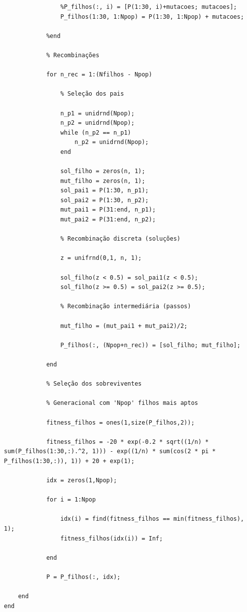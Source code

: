 \documentclass{report}
\begin{document}
\begin{lstlisting}
                %P_filhos(:, i) = [P(1:30, i)+mutacoes; mutacoes];
                P_filhos(1:30, 1:Npop) = P(1:30, 1:Npop) + mutacoes;

            %end

            % Recombinações

            for n_rec = 1:(Nfilhos - Npop)
                
                % Seleção dos pais                

                n_p1 = unidrnd(Npop);
                n_p2 = unidrnd(Npop);
                while (n_p2 == n_p1)
                    n_p2 = unidrnd(Npop);
                end
                        
                sol_filho = zeros(n, 1);
                mut_filho = zeros(n, 1);
                sol_pai1 = P(1:30, n_p1);
                sol_pai2 = P(1:30, n_p2);
                mut_pai1 = P(31:end, n_p1);
                mut_pai2 = P(31:end, n_p2);

                % Recombinação discreta (soluções)
                
                z = unifrnd(0,1, n, 1);

                sol_filho(z < 0.5) = sol_pai1(z < 0.5);
                sol_filho(z >= 0.5) = sol_pai2(z >= 0.5);

                % Recombinação intermediária (passos)

                mut_filho = (mut_pai1 + mut_pai2)/2;

                P_filhos(:, (Npop+n_rec)) = [sol_filho; mut_filho];
                    
            end

            % Seleção dos sobreviventes

            % Generacional com 'Npop' filhos mais aptos

            fitness_filhos = ones(1,size(P_filhos,2));
            
            fitness_filhos = -20 * exp(-0.2 * sqrt((1/n) * sum(P_filhos(1:30,:).^2, 1))) - exp((1/n) * sum(cos(2 * pi * P_filhos(1:30,:)), 1)) + 20 + exp(1);

            idx = zeros(1,Npop);

            for i = 1:Npop

                idx(i) = find(fitness_filhos == min(fitness_filhos), 1);
                fitness_filhos(idx(i)) = Inf;

            end

            P = P_filhos(:, idx);

    end
end

	\end{lstlisting}
	
\end{document}

